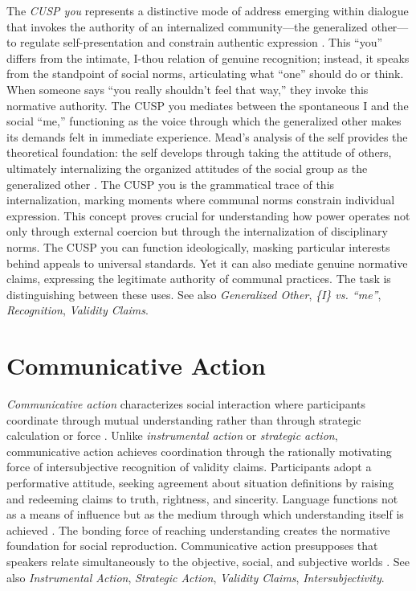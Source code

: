 \documentclass{book}
\begin{document}
The \textit{CUSP you} represents a distinctive mode of address emerging within dialogue that invokes the authority of an internalized community---the generalized other---to regulate self-presentation and constrain authentic expression \parencite{Carspecken1999}. This ``you'' differs from the intimate, I-thou relation of genuine recognition; instead, it speaks from the standpoint of social norms, articulating what ``one'' should do or think. When someone says ``you really shouldn't feel that way,'' they invoke this normative authority. The CUSP you mediates between the spontaneous {I} and the social ``me,'' functioning as the voice through which the generalized other makes its demands felt in immediate experience. Mead's analysis of the self provides the theoretical foundation: the self develops through taking the attitude of others, ultimately internalizing the organized attitudes of the social group as the generalized other \parencite{mead1934social}. The CUSP you is the grammatical trace of this internalization, marking moments where communal norms constrain individual expression. This concept proves crucial for understanding how power operates not only through external coercion but through the internalization of disciplinary norms. The CUSP you can function ideologically, masking particular interests behind appeals to universal standards. Yet it can also mediate genuine normative claims, expressing the legitimate authority of communal practices. The task is distinguishing between these uses. See also \textit{Generalized Other}, \textit{\{I\} vs. ``me''}, \textit{Recognition}, \textit{Validity Claims}.

\section{Communicative Action}

\textit{Communicative action} characterizes social interaction where participants coordinate through mutual understanding rather than through strategic calculation or force \parencite{Habermas1984, habermas1992individuation}. Unlike \textit{instrumental action} or \textit{strategic action}, communicative action achieves coordination through the rationally motivating force of intersubjective recognition of validity claims. Participants adopt a performative attitude, seeking agreement about situation definitions by raising and redeeming claims to truth, rightness, and sincerity. Language functions not as a means of influence but as the medium through which understanding itself is achieved \parencite{Habermas1984}. The bonding force of reaching understanding creates the normative foundation for social reproduction. Communicative action presupposes that speakers relate simultaneously to the objective, social, and subjective worlds \parencite{Habermas1984}. See also \textit{Instrumental Action}, \textit{Strategic Action}, \textit{Validity Claims}, \textit{Intersubjectivity}.
\end{document}
